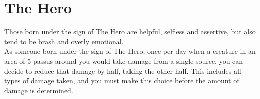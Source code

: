 \section{The Hero}

Those born under the sign of The Hero are helpful, selfless and assertive, but also tend to be brash and overly emotional.\\
As someone born under the sign of The Hero, once per day when a creature in an area of 5 passus around you would take damage from a single source, you can decide to reduce that damage by half, taking the other half. This includes all types of damage taken, and you must make this choice before the amount of damage is determined.\\